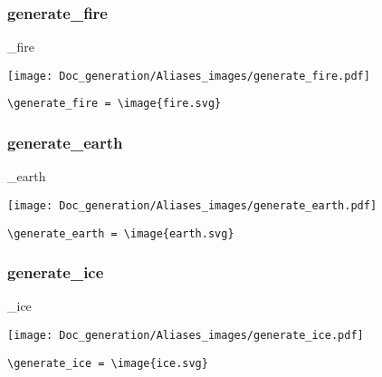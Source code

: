 \documentclass{article}
\begin{document}
\subsubsection{generate\_fire}
\begin{minipage}{0.45\linewidth}
\raggedright
\begin{spverbatim}
\generate_fire 
\end{spverbatim}
\end{minipage}
\begin{minipage}{0.45\linewidth}
\raggedleft
\texttt{[image: Doc\_generation/Aliases\_images/generate\_fire.pdf]}
\end{minipage}
\begin{center}
\begin{BVerbatim}
\generate_fire = \image{fire.svg}
\end{BVerbatim}
\end{center}

\subsubsection{generate\_earth}
\begin{minipage}{0.45\linewidth}
\raggedright
\begin{spverbatim}
\generate_earth 
\end{spverbatim}
\end{minipage}
\begin{minipage}{0.45\linewidth}
\raggedleft
\texttt{[image: Doc\_generation/Aliases\_images/generate\_earth.pdf]}
\end{minipage}
\begin{center}
\begin{BVerbatim}
\generate_earth = \image{earth.svg}
\end{BVerbatim}
\end{center}

\subsubsection{generate\_ice}
\begin{minipage}{0.45\linewidth}
\raggedright
\begin{spverbatim}
\generate_ice 
\end{spverbatim}
\end{minipage}
\begin{minipage}{0.45\linewidth}
\raggedleft
\texttt{[image: Doc\_generation/Aliases\_images/generate\_ice.pdf]}
\end{minipage}
\begin{center}
\begin{BVerbatim}
\generate_ice = \image{ice.svg}
\end{BVerbatim}
\end{center}
\end{document}
